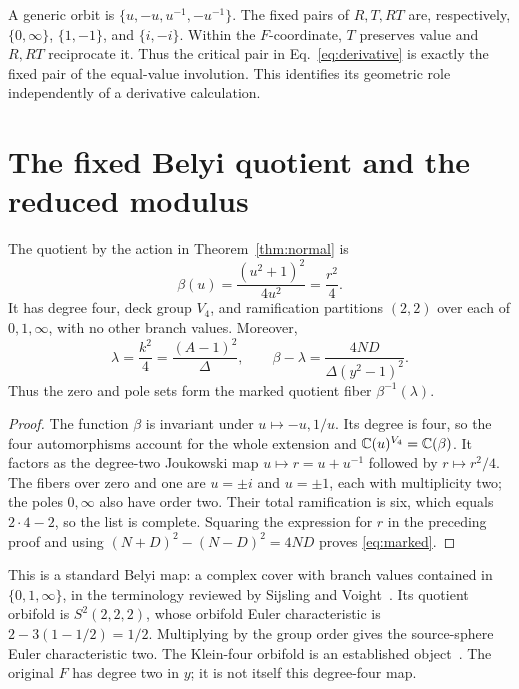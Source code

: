 A generic orbit is \(\{u,-u,u^{-1},-u^{-1}\}\). The fixed pairs of \(R,T,RT\) are, respectively, \(\{0,\infty\}\), \(\{1,-1\}\), and \(\{i,-i\}\). Within the \(F\)-coordinate, \(T\) preserves value and \(R,RT\) reciprocate it. Thus the critical pair in Eq.~\eqref{eq:derivative} is exactly the fixed pair of the equal-value involution. This identifies its geometric role independently of a derivative calculation.


\section{The fixed Belyi quotient and the reduced modulus}\label{sec:belyi}

\begin{theorem}\label{thm:belyi}
The quotient by the action in Theorem~\ref{thm:normal} is
\begin{equation}\label{eq:beta}
\beta(u)=\frac{(u^2+1)^2}{4u^2}=\frac{r^2}{4}.
\end{equation}
It has degree four, deck group \(V_4\), and ramification partitions \((2,2)\) over each of \(0,1,\infty\), with no other branch values. Moreover,
\begin{equation}\label{eq:marked}
\lambda=\frac{k^2}{4}=\frac{(A-1)^2}{\Delta},\qquad
\beta-\lambda=\frac{4ND}{\Delta(y^2-1)^2}.
\end{equation}
Thus the zero and pole sets form the marked quotient fiber \(\beta^{-1}(\lambda)\).
\end{theorem}
\begin{proof}
The function \(\beta\) is invariant under \(u\mapsto-u,1/u\). Its degree is four, so the four automorphisms account for the whole extension and
\(\mathbb C(u)^{V_4}=\mathbb C(\beta)\). It factors as the degree-two Joukowski map \(u\mapsto r=u+u^{-1}\) followed by \(r\mapsto r^2/4\). The fibers over zero and one are \(u=\pm i\) and \(u=\pm1\), each with multiplicity two; the poles \(0,\infty\) also have order two. Their total ramification is six, which equals \(2\cdot4-2\), so the list is complete. Squaring the expression for \(r\) in the preceding proof and using \((N+D)^2-(N-D)^2=4ND\) proves \eqref{eq:marked}.
\end{proof}

This is a standard Belyi map: a complex cover with branch values contained in \(\{0,1,\infty\}\), in the terminology reviewed by Sijsling and Voight~\cite{SV}. Its quotient orbifold is \(S^2(2,2,2)\), whose orbifold Euler characteristic is
\(2-3(1-1/2)=1/2\). Multiplying by the group order gives the source-sphere Euler characteristic two. The Klein-four orbifold is an established object~\cite{KO}. The original \(F\) has degree two in \(y\); it is not itself this degree-four map.

